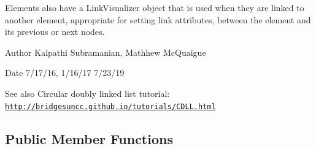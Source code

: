 Elements also have a Link\+Visualizer object that is used when they are linked to another element, appropriate for setting link attributes, between the element and its previous or next nodes.

\begin{DoxyAuthor}{Author}
Kalpathi Subramanian, Mathhew Mc\+Quaigue
\end{DoxyAuthor}
\begin{DoxyDate}{Date}
7/17/16, 1/16/17 7/23/19
\end{DoxyDate}
\begin{DoxySeeAlso}{See also}
Circular doubly linked list tutorial\+: \href{http://bridgesuncc.github.io/tutorials/CDLL.html}{\tt http\+://bridgesuncc.\+github.\+io/tutorials/\+C\+D\+L\+L.\+html} 
\end{DoxySeeAlso}
\subsection*{Public Member Functions}
